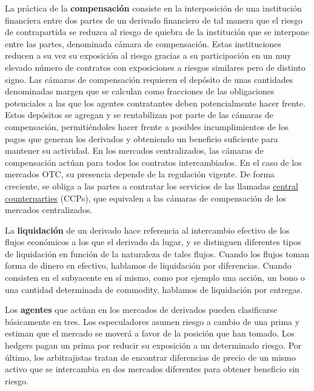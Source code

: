 \documentclass{nuevotema}
\begin{document}
La práctica de la \textbf{compensación} consiste en la interposición de una institución financiera entre dos partes de un derivado financiero de tal manera que el riesgo de contrapartida se reduzca al riesgo de quiebra de la institución que se interpone entre las partes, denominada cámara de compensación. Estas instituciones reducen a su vez su exposición al riesgo gracias a su participación en un muy elevado número de contratos con exposiciones a riesgos similares pero de distinto signo. Las cámaras de compensación requieren el depósito de unas cantidades denominadas margen que se calculan como fracciones de las obligaciones potenciales a las que los agentes contratantes deben potencialmente hacer frente. Estos depósitos se agregan y se rentabilizan por parte de las cámaras de compensación, permitiéndoles hacer frente a posibles incumplimientos de los pagos que generan los derivados y obteniendo un beneficio suficiente para mantener su actividad. En los mercados centralizados, las cámaras de compensación actúan para todos los contratos intercambiados. En el caso de los mercados OTC, su presencia depende de la regulación vigente. De forma creciente, se obliga a las partes a contratar los servicios de las llamadas \underline{central counterparties} (CCPs), que equivalen a las cámaras de compensación de los mercados centralizados.

La \textbf{liquidación} de un derivado hace referencia al intercambio efectivo de los flujos económicos a los que el derivado da lugar, y se distinguen diferentes tipos de liquidación en función de la naturaleza de tales flujos. Cuando los flujos toman forma de dinero en efectivo, hablamos de liquidación por diferencias. Cuando consisten en el subyacente en sí mismo, como por ejemplo una acción, un bono o una cantidad determinada de commodity, hablamos de liquidación por entregas. 

Los \textbf{agentes} que actúan en los mercados de derivados pueden clasificarse básicamente en tres. Los especuladores asumen riesgo a cambio de una prima y estiman que el mercado se moverá a favor de la posición que han tomado. Los hedgers pagan un prima por reducir su exposición a un determinado riesgo. Por último, los arbitrajistas tratan de encontrar diferencias de precio de un mismo activo que se intercambia en dos mercados diferentes para obtener beneficio sin riesgo.
\end{document}

